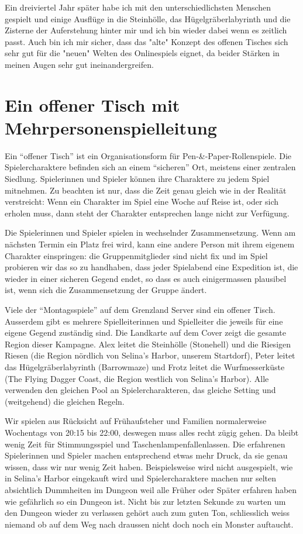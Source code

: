 \documentclass[11pt]{wbzine}
\begin{document}
\begin{multicols}{2}
Ein dreiviertel Jahr später habe ich mit den unterschiedlichsten
Menschen gespielt und einige Ausflüge in die Steinhölle, das
Hügelgräberlabyrinth und die Zisterne der Auferstehung hinter mir und
ich bin wieder dabei wenn es zeitlich passt. Auch bin ich mir sicher,
dass das "alte" Konzept des offenen Tisches sich sehr gut für die "neuen"
Welten des Onlinespiels eignet, da beider Stärken in meinen Augen sehr
gut ineinandergreifen.

\section{Ein offener Tisch mit Mehrpersonenspielleitung}

Ein “offener Tisch” ist ein Organisationsform für Pen-\&-Paper-Rollenspiele.
Die Spielercharaktere befinden sich an einem “sicheren” Ort, meistens einer
zentralen Siedlung. Spielerinnen und Spieler können ihre Charaktere zu jedem
Spiel mitnehmen. Zu beachten ist nur, dass die Zeit genau gleich wie in der
Realität verstreicht: Wenn ein Charakter im Spiel eine Woche auf Reise ist,
oder sich erholen muss, dann steht der Charakter entsprechen lange nicht zur
Verfügung.

Die Spielerinnen und Spieler spielen in wechselnder Zusammensetzung. Wenn am
nächsten Termin ein Platz frei wird, kann eine andere Person mit ihrem eigenem
Charakter einspringen: die Gruppenmitglieder sind nicht fix und im Spiel
probieren wir das so zu handhaben, dass jeder Spielabend eine Expedition ist,
die wieder in einer sicheren Gegend endet, so dass es auch einigermassen
plausibel ist, wenn sich die Zusammensetzung der Gruppe ändert.

Viele der ``Montagsspiele'' auf dem Grenzland Server sind ein offener Tisch.
Ausserdem gibt es mehrere Spielleiterinnen und Spielleiter die jeweils für
eine eigene Gegend zuständig sind. Die Landkarte auf dem Cover zeigt die
gesamte Region dieser Kampagne. Alex leitet die Steinhölle (Stonehell) und die
Riesigen Riesen (die Region nördlich von Selina's Harbor, unserem Startdorf),
Peter leitet das Hügelgräberlabyrinth (Barrowmaze) und Frotz leitet die
Wurfmesserküste (The Flying Dagger Coast, die Region westlich von Selina's
Harbor). Alle verwenden den gleichen Pool an Spielercharakteren, das gleiche
Setting und (weitgehend) die gleichen Regeln.

Wir spielen aus Rücksicht auf Frühaufsteher und Familien normalerweise
Wochentags von 20:15 bis 22:00, deswegen muss alles recht zügig gehen. Da
bleibt wenig Zeit für Stimmungsspiel und Taschenlampenfallenlassen. Die
erfahrenen Spielerinnen und Spieler machen entsprechend etwas mehr Druck, da
sie genau wissen, dass wir nur wenig Zeit haben. Beispielsweise wird nicht
ausgespielt, wie in Selina's Harbor eingekauft wird und Spielercharaktere
machen nur selten absichtlich Dummheiten im Dungeon weil alle Früher oder
Später erfahren haben wie gefährlich so ein Dungeon ist. Nicht bis zur letzten
Sekunde zu warten um den Dungeon wieder zu verlassen gehört auch zum guten Ton,
schliesslich weiss niemand ob auf dem Weg nach draussen nicht doch noch ein
Monster auftaucht.


\end{multicols}
\end{document}
